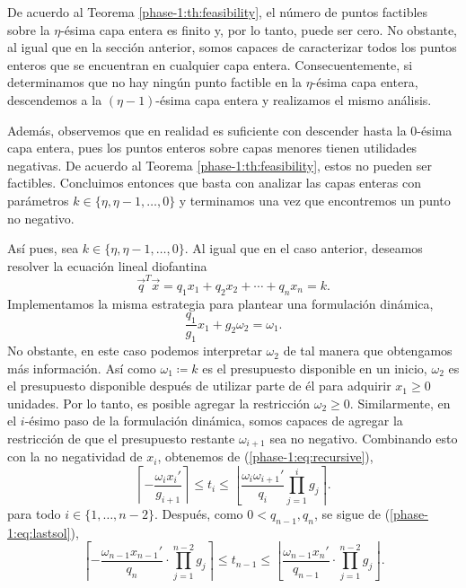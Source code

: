 De acuerdo al Teorema \ref{phase-1:th:feasibility}, el número de puntos factibles sobre la
$\eta$-ésima capa entera es finito y, por lo tanto, puede ser cero. No obstante, al igual que en la
sección anterior, somos capaces de caracterizar todos los puntos enteros que se encuentran en
cualquier capa entera. Consecuentemente, si determinamos que no hay ningún punto factible en la
$\eta$-ésima capa entera, descendemos a la $(\eta -1)$-ésima capa entera y realizamos el mismo
análisis.

Además, observemos que en realidad es suficiente con descender hasta la 0-ésima capa entera, pues
los puntos enteros sobre capas menores tienen utilidades negativas. De acuerdo al Teorema
\ref{phase-1:th:feasibility}, estos no pueden ser factibles. Concluimos entonces que basta con
analizar las capas enteras con parámetros $k \in \lbrace \eta, \eta - 1, \ldots, 0 \rbrace$ y
terminamos una vez que encontremos un punto no negativo.

Así pues, sea $k \in \lbrace \eta, \eta - 1, \ldots, 0 \rbrace$. Al igual que en el caso anterior,
deseamos resolver la ecuación lineal diofantina
\begin{equation*}
	\vec{q}^T\vec{x} = q_1x_1 + q_2x_2 + \cdots + q_nx_n = k.
\end{equation*}
Implementamos la misma estrategia para plantear una formulación dinámica,
\begin{equation*}
	\frac{q_1}{g_1}x_1 + g_2\omega_2 = \omega_1.
\end{equation*}
No obstante, en este caso podemos interpretar $\omega_2$ de tal manera que obtengamos más
información. Así como $\omega_1 \coloneq k$  es el presupuesto disponible en un inicio, $\omega_2$
es el presupuesto disponible después de utilizar parte de él para adquirir $x_1 \geq 0$ unidades.
Por lo tanto, es posible agregar la restricción $\omega_2 \geq 0$. Similarmente, en el $i$-ésimo
paso de la formulación dinámica, somos capaces de agregar la restricción de que el presupuesto
restante $\omega_{i + 1}$ sea no negativo. Combinando esto con la no negatividad de $x_i$, obtenemos
de (\ref{phase-1:eq:recursive}),
\begin{equation}
	\label{phase-1:finite:eq:param-bounds}
	\left\lceil -\frac{\omega_ix_i'}{g_{i+1}} \right\rceil
	\leq
	t_i
	\leq
	\left\lfloor \frac{\omega_i\omega_{i+1}'}{q_i} \prod_{j=1}^{i}g_j \right\rceil.
\end{equation}
para todo $i \in \lbrace 1, \ldots, n - 2\rbrace$. Después, como $0 < q_{n - 1}, q_n$, se sigue de
(\ref{phase-1:eq:lastsol}),
\begin{equation}
	\label{phase-1:finite:eq:param-bounds-last}
	\left\lceil -\frac{\omega_{n-1}x_{n-1}'}{q_n} \cdot \prod_{j=1}^{n-2}g_j \right\rceil
	\leq
	t_{n - 1}
	\leq
	\left\lfloor \frac{\omega_{n-1}x_{n}'}{q_{n-1}} \cdot \prod_{j=1}^{n-2}g_j \right\rfloor.
\end{equation}

